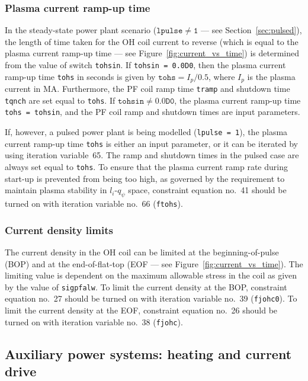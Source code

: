 \documentclass[11pt,a4paper]{report}
\begin{document}
\subsubsection{Plasma current ramp-up time}
\label{sec:tohs}

In the steady-state power plant scenario ($\mathtt{lpulse \not= 1}$ --- see
Section~\ref{sec:pulsed}), the length of time taken for the OH coil current to
reverse (which is equal to the plasma current ramp-up time --- see
Figure~\ref{fig:current_vs_time}) is determined from the value of switch
\texttt{tohsin}. If \texttt{tohsin = 0.0D0}, then the plasma current ramp-up
time \texttt{tohs} in seconds is given by $\mathtt{tohs} = I_p / 0.5$, where
$I_p$ is the plasma current in MA\@. Furthermore, the PF coil ramp time
\texttt{tramp} and shutdown time \texttt{tqnch} are set equal to
\texttt{tohs}.  If $\mathtt{tohsin \not= 0.0D0}$, the plasma current ramp-up
time \texttt{tohs = tohsin}, and the PF coil ramp and shutdown times are input
parameters.

If, however, a pulsed power plant is being modelled (\texttt{lpulse = 1}), the
plasma current ramp-up time \texttt{tohs} is either an input parameter, or it can be
iterated by using iteration variable~65. The ramp and shutdown times in the
pulsed case are always set equal to \texttt{tohs}. To ensure that the plasma
current ramp rate during start-up is prevented from being too high, as
governed by the requirement to maintain plasma stability in $l_i$-$q_\psi$
space, constraint equation no.\ 41 should be turned on with iteration variable
no.\ 66 (\texttt{ftohs}).

\subsubsection{Current density limits}

The current density in the OH coil can be limited at the beginning-of-pulse
(BOP) and at the end-of-flat-top (EOF --- see
Figure~\ref{fig:current_vs_time}). The limiting value is dependent on the
maximum allowable stress in the coil as given by the value of
\texttt{sigpfalw}. To limit the current density at the BOP, constraint
equation no.\ 27 should be turned on with iteration variable no.\ 39
(\texttt{fjohc0}). To limit the current density at the EOF, constraint
equation no.\ 26 should be turned on with iteration variable no.\ 38
(\texttt{fjohc}).

\subsection{Auxiliary power systems: heating and current drive}
\end{document}
